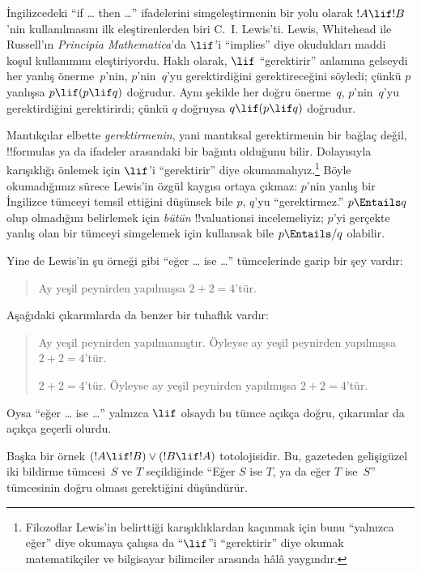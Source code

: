 



İngilizcedeki ``if \dots{} then \dots'' ifadelerini simgeleştirmenin bir
yolu olarak $!A\lif !B$'nin kullanılmasını ilk eleştirenlerden biri
C.~I. Lewis'ti. Lewis, Whitehead ile Russell'ın \emph{Principia
Mathematica}'da $\lif$'i ``implies'' diye okudukları maddi koşul kullanımını
eleştiriyordu. Haklı olarak, $\lif$ ``gerektirir'' anlamına gelseydi her
yanlış önerme~$p$'nin, $p$'nin~$q$'yu gerektirdiğini gerektireceğini söyledi;
çünkü $p$ yanlışsa $p\lif(p\lif q)$ doğrudur. Aynı şekilde her doğru
önerme~$q$, $p$'nin~$q$'yu gerektirdiğini gerektirirdi; çünkü $q$ doğruysa
$q\lif(p\lif q)$ doğrudur.

Mantıkçılar elbette \emph{gerektirmenin}, yani mantıksal gerektirmenin bir
bağlaç değil, !!{formula}s ya da ifadeler arasındaki bir bağıntı olduğunu
bilir. Dolayısıyla karışıklığı önlemek için $\lif$'i ``gerektirir'' diye
okumamalıyız.\footnote{Filozoflar Lewis'in belirttiği karışıklıklardan
  kaçınmak için bunu ``yalnızca eğer'' diye okumaya çalışsa da ``$\lif$''i
  ``gerektirir'' diye okumak matematikçiler ve bilgisayar bilimciler arasında
  hâlâ yaygındır.} Böyle okumadığımız sürece Lewis'in özgül kaygısı ortaya
çıkmaz: $p$'nin yanlış bir İngilizce tümceyi temsil ettiğini düşünsek bile
$p$, $q$'yu ``gerektirmez.'' $p\Entails q$ olup olmadığını belirlemek için
\emph{bütün} !!{valuation}s{}i incelemeliyiz; $p$'yi gerçekte yanlış olan bir
tümceyi simgelemek için kullansak bile $p\Entails/ q$ olabilir.

Yine de Lewis'in şu örneği gibi ``eğer \dots{} ise \dots'' tümcelerinde
garip bir şey vardır:
\begin{quote}
Ay yeşil peynirden yapılmışsa $2+2=4$'tür.
\end{quote}
Aşağıdaki çıkarımlarda da benzer bir tuhaflık vardır:
\begin{quote}
  Ay yeşil peynirden yapılmamıştır. Öyleyse ay yeşil peynirden yapılmışsa
  $2+2=4$'tür.

  $2+2=4$'tür. Öyleyse ay yeşil peynirden yapılmışsa $2+2=4$'tür.
\end{quote}
Oysa ``eğer \dots{} ise \dots'' yalnızca $\lif$ olsaydı bu tümce açıkça
doğru, çıkarımlar da açıkça geçerli olurdu.

Başka bir örnek $(!A\lif !B)\lor(!B\lif !A)$ totolojisidir. Bu, gazeteden
gelişigüzel iki bildirme tümcesi~$S$ ve $T$ seçildiğinde ``Eğer $S$ ise $T$,
ya da eğer $T$ ise~$S$'' tümcesinin doğru olması gerektiğini düşündürür.

